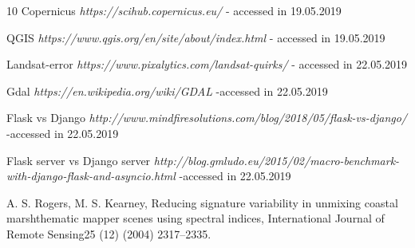 \documentclass[12pt, a4paper]{report}
\begin{document}
\begin{thebibliography} {10}
Copernicus \textit{https://scihub.copernicus.eu/} - accessed in 19.05.2019

QGIS \textit{https://www.qgis.org/en/site/about/index.html} - accessed in 19.05.2019

Landsat-error \textit{https://www.pixalytics.com/landsat-quirks/} - accessed in 22.05.2019

Gdal \textit{https://en.wikipedia.org/wiki/GDAL} -accessed in 22.05.2019

Flask vs Django \textit{http://www.mindfiresolutions.com/blog/2018/05/flask-vs-django/} -accessed in 22.05.2019

Flask server vs Django server \textit{http://blog.gmludo.eu/2015/02/macro-benchmark-with-django-flask-and-asyncio.html} -accessed in 22.05.2019

A. S. Rogers, M. S. Kearney, Reducing signature variability in unmixing coastal marshthematic mapper scenes using spectral indices, International Journal of Remote Sensing25 (12) (2004) 2317–2335.






\end{thebibliography}






\end{document}

